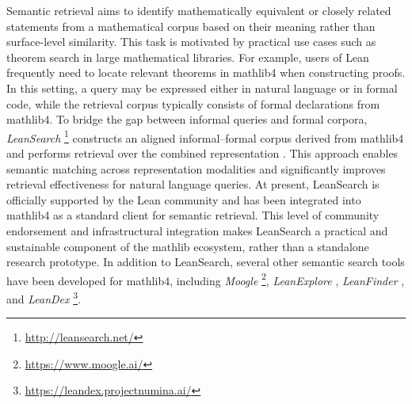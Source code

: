 \documentclass[11pt]{article}
\numberwithin{equation}{section}
\begin{document}
Semantic retrieval aims to identify mathematically equivalent or closely related statements from a mathematical corpus based on their meaning rather than surface-level similarity. This task is motivated by practical use cases such as theorem search in large mathematical libraries. For example, users of Lean frequently need to locate relevant theorems in mathlib4 when constructing proofs. In this setting, a query may be expressed either in natural language or in formal code, while the retrieval corpus typically consists of formal declarations from mathlib4. To bridge the gap between informal queries and formal corpora, \textit{LeanSearch} \footnote{\href{https://leansearch.net/}{http://leansearch.net/}} constructs an aligned informal–formal corpus derived from mathlib4 and performs retrieval over the combined representation \cite{gao-etal-2024-semantic-search}. This approach enables semantic matching across representation modalities and significantly improves retrieval effectiveness for natural language queries. At present, LeanSearch is officially supported by the Lean community and has been integrated into mathlib4 as a standard client for semantic retrieval. This level of community endorsement and infrastructural integration makes LeanSearch a practical and sustainable component of the mathlib ecosystem, rather than a standalone research prototype. In addition to LeanSearch, several other semantic search tools have been developed for mathlib4, including \textit{Moogle} \footnote{\href{https://www.moogle.ai/}{https://www.moogle.ai/}}, \textit{LeanExplore} \cite{asher2025leanexplore}, \textit{LeanFinder} \cite{lu2025lean}, and \textit{LeanDex} \footnote{\href{https://leandex.projectnumina.ai/}{https://leandex.projectnumina.ai/}}.
\end{document}
